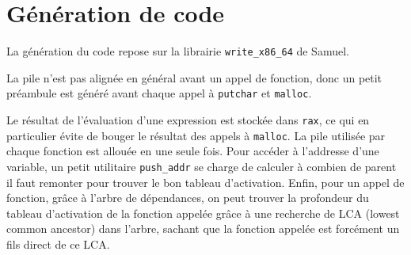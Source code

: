 \documentclass{scrartcl}
\begin{document}
\section*{Génération de code}
La génération du code repose sur la librairie \verb|write_x86_64| de Samuel.\par
La pile n'est pas alignée en général avant un appel de fonction, donc un petit
préambule est généré avant chaque appel à \verb|putchar| et \verb|malloc|.\par
Le résultat de l'évaluation d'une expression est stockée dans \verb|rax|, ce qui
en particulier évite de bouger le résultat des appels à \verb|malloc|. La pile
utilisée par chaque fonction est allouée en une seule fois. Pour accéder à l'addresse
d'une variable, un petit utilitaire \verb|push_addr| se charge de calculer à combien de parent
il faut remonter pour trouver le bon tableau d'activation. Enfin, pour un appel de fonction,
grâce à l'arbre de dépendances, on peut trouver la profondeur du tableau d'activation de la
fonction appelée grâce à une recherche de LCA (lowest common ancestor) dans l'arbre, sachant
que la fonction appelée est forcément un fils direct de ce LCA.
\end{document}

